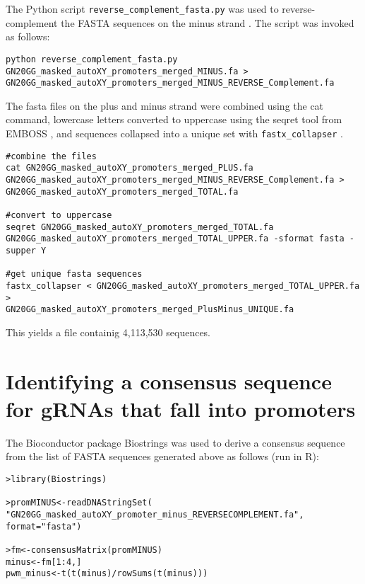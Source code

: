 The Python script \verb|reverse_complement_fasta.py| was used to reverse-complement the FASTA sequences on the minus strand \cite{Kao:Online}. The script was invoked as follows:

\begin{small}\begin{lstlisting}
python reverse_complement_fasta.py GN20GG_masked_autoXY_promoters_merged_MINUS.fa >
GN20GG_masked_autoXY_promoters_merged_MINUS_REVERSE_Complement.fa
\end{lstlisting}\end{small}

The fasta files on the plus and minus strand were combined using the cat command, lowercase letters converted to uppercase using the seqret tool from EMBOSS \cite{Rice:2000wr}, and sequences collapsed into a unique set with \verb|fastx_collapser| \cite{Hannon:Online} . 

\begin{small}\begin{lstlisting}
#combine the files
cat GN20GG_masked_autoXY_promoters_merged_PLUS.fa 
GN20GG_masked_autoXY_promoters_merged_MINUS_REVERSE_Complement.fa > GN20GG_masked_autoXY_promoters_merged_TOTAL.fa

#convert to uppercase 
seqret GN20GG_masked_autoXY_promoters_merged_TOTAL.fa 
GN20GG_masked_autoXY_promoters_merged_TOTAL_UPPER.fa -sformat fasta -supper Y   

#get unique fasta sequences
fastx_collapser < GN20GG_masked_autoXY_promoters_merged_TOTAL_UPPER.fa >
GN20GG_masked_autoXY_promoters_merged_PlusMinus_UNIQUE.fa

\end{lstlisting}\end{small}

This yields a file containig 4,113,530 sequences.

\section{Identifying a consensus sequence for gRNAs that fall into promoters}

The Bioconductor package Biostrings \cite{Biostrings} was used to derive a consensus sequence from the list of FASTA sequences generated above as follows (run in R):

\begin{small}\begin{lstlisting}
>library(Biostrings)

>promMINUS<-readDNAStringSet(
"GN20GG_masked_autoXY_promoter_minus_REVERSECOMPLEMENT.fa", format="fasta")  

>fm<-consensusMatrix(promMINUS) 
minus<-fm[1:4,] 
pwm_minus<-t(t(minus)/rowSums(t(minus)))  

\end{lstlisting}\end{small}

